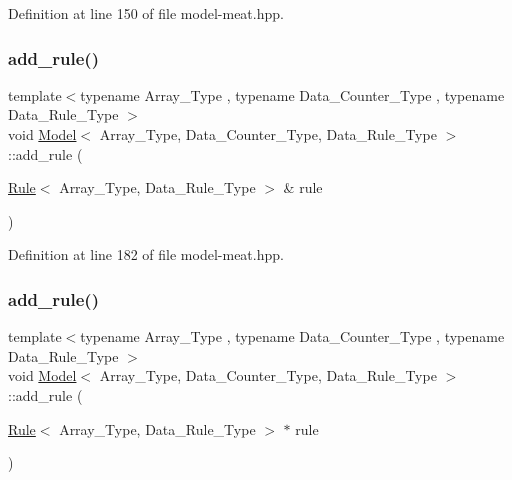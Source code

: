 Definition at line 150 of file model-\/meat.\+hpp.

\mbox{\label{class_model_af2c3f6300b90e6a2a4deaebaf2b0e732}} 
\subsubsection{\texorpdfstring{add\+\_\+rule()}{add\_rule()}\hspace{0.1cm}{\footnotesize\ttfamily [1/3]}}
{\footnotesize\ttfamily template$<$typename Array\+\_\+\+Type , typename Data\+\_\+\+Counter\+\_\+\+Type , typename Data\+\_\+\+Rule\+\_\+\+Type $>$ \\
void \hyperlink{class_model}{Model}$<$ Array\+\_\+\+Type, Data\+\_\+\+Counter\+\_\+\+Type, Data\+\_\+\+Rule\+\_\+\+Type $>$\+::add\+\_\+rule (\begin{DoxyParamCaption}\item[{\hyperlink{class_rule}{Rule}$<$ Array\+\_\+\+Type, Data\+\_\+\+Rule\+\_\+\+Type $>$ \&}]{rule }\end{DoxyParamCaption})\hspace{0.3cm}{\ttfamily [inline]}}



Definition at line 182 of file model-\/meat.\+hpp.

\mbox{\label{class_model_aba5b01457e2f624766a72ba15b8cb6be}} 
\subsubsection{\texorpdfstring{add\+\_\+rule()}{add\_rule()}\hspace{0.1cm}{\footnotesize\ttfamily [2/3]}}
{\footnotesize\ttfamily template$<$typename Array\+\_\+\+Type , typename Data\+\_\+\+Counter\+\_\+\+Type , typename Data\+\_\+\+Rule\+\_\+\+Type $>$ \\
void \hyperlink{class_model}{Model}$<$ Array\+\_\+\+Type, Data\+\_\+\+Counter\+\_\+\+Type, Data\+\_\+\+Rule\+\_\+\+Type $>$\+::add\+\_\+rule (\begin{DoxyParamCaption}\item[{\hyperlink{class_rule}{Rule}$<$ Array\+\_\+\+Type, Data\+\_\+\+Rule\+\_\+\+Type $>$ $\ast$}]{rule }\end{DoxyParamCaption})\hspace{0.3cm}{\ttfamily [inline]}}



